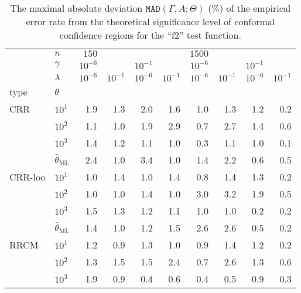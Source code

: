 \documentclass[a4paper,14pt]{extarticle}
\begin{document}
\begin{table}
  \centering
  \caption{The maximal absolute deviation $\mathtt{MAD}(\Gamma, A; \Theta)$ ($\%$)
  of the empirical error rate from the theoretical significance level of conformal
  confidence regions for the ``f2'' test function.}
  \label{tab:nongaussian_f2_2d_cov_conf}
  \begin{tabular}{ll||rrrr|rrrr}
  \toprule
       & $n$ &     $150$  &          &          &          &     $1500$ &          &          &          \\\cline{2-2}
       & $\gamma$ & $10^{-6}$ &          & $10^{-1}$ &          & $10^{-6}$ &          & $10^{-1}$ &          \\\cline{2-2}
       & $\lambda$ & $10^{-6}$ & $10^{-1}$ & $10^{-6}$ & $10^{-1}$ & $10^{-6}$ & $10^{-1}$ & $10^{-6}$ & $10^{-1}$ \\\cline{2-2}
  type & $\theta$ &          &          &          &          &          &          &          &          \\
  \midrule
  CRR & $10^1$ &      1.9 &      1.3 &      2.0 &      1.6 &      1.0 &      1.3 &      1.2 &      0.2 \\
       & $10^2$ &      1.1 &      1.0 &      1.9 &      2.9 &      0.7 &      2.7 &      1.4 &      0.6 \\
       & $10^3$ &      1.4 &      1.2 &      1.1 &      1.0 &      0.3 &      1.1 &      1.0 &      0.1 \\
       & $\hat{\theta}_\text{ML}$ &      2.4 &      1.0 &      3.4 &      1.0 &      1.4 &      2.2 &      0.6 &      0.5 \\
  \midrule
  CRR-loo & $10^1$ &      1.0 &      1.4 &      1.0 &      1.4 &      0.8 &      1.4 &      1.3 &      0.2 \\
       & $10^2$ &      1.0 &      1.0 &      1.4 &      1.0 &      3.0 &      3.2 &      1.9 &      0.5 \\
       & $10^3$ &      1.5 &      1.3 &      1.2 &      1.1 &      1.0 &      1.0 &      0.2 &      0.2 \\
       & $\hat{\theta}_\text{ML}$ &      1.4 &      1.0 &      1.2 &      1.5 &      2.6 &      2.6 &      0.5 &      0.2 \\
  \midrule
  RRCM & $10^1$ &      1.2 &      0.9 &      1.3 &      1.0 &      0.9 &      1.4 &      1.2 &      0.2 \\
       & $10^2$ &      1.3 &      1.5 &      1.5 &      2.4 &      0.7 &      2.6 &      1.3 &      0.6 \\
       & $10^3$ &      1.9 &      0.9 &      0.4 &      0.6 &      0.4 &      0.5 &      0.9 &      0.3 \\

\end{tabular}
\end{table}
\end{document}
